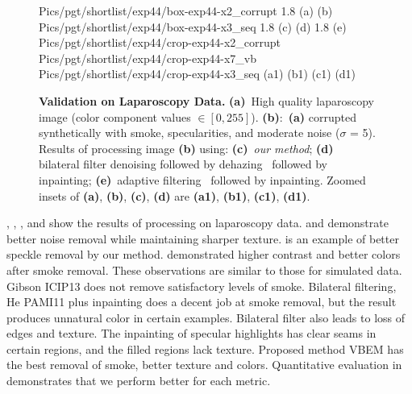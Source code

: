 \begin{figure}[!h]
     {Pics/pgt/shortlist/exp44/box-exp44-x2_corrupt}  {1.8} {(a)} {(b)}
     {Pics/pgt/shortlist/exp44/box-exp44-x3_seq} {1.8} {(c)} {(d)}
     {1.8} {(e)}
     {Pics/pgt/shortlist/exp44/crop-exp44-x2_corrupt} {Pics/pgt/shortlist/exp44/crop-exp44-x7_vb} {Pics/pgt/shortlist/exp44/crop-exp44-x3_seq}  {(a1)} {(b1)} {(c1)} {(d1)}
    \caption
    {
        {\bf Validation on Laparoscopy Data. }
        {\bf (a)}~High quality laparoscopy image (color component values $\in [0,255]$).
        {\bf (b)}:~{\bf (a)} corrupted synthetically with smoke, specularities, and moderate noise ($\sigma$ = 5).
        Results of processing image {\bf (b)} using:
        {\bf (c)}~{\em our method};
        {\bf (d)}~ bilateral filter denoising followed by dehazing~\cite{he2011dark} followed by inpainting;
        {\bf (e)}~adaptive filtering~\cite{gibson2013wiener} followed by inpainting.
        Zoomed insets of {\bf (a)}, {\bf (b)}, {\bf (c)}, {\bf (d)} are {\bf (a1)}, {\bf (b1)}, {\bf (c1)}, {\bf (d1)}.
    }
    \label{fig:imagesPgt4}
\end{figure}


, , , and  show the results of processing on laparoscopy data.  and  demonstrate better noise removal while maintaining sharper texture. is an example of better speckle removal by our method.  demonstrated higher contrast and better colors after smoke removal. These observations are similar to those for simulated data. Gibson ICIP13 \cite{gibson2013wiener} does not remove satisfactory levels of smoke. Bilateral filtering, He PAMI11 \cite{he2011dark} plus inpainting does a decent job at smoke removal, but the result produces unnatural color in certain examples. Bilateral filter also leads to loss of edges and texture. The inpainting of specular highlights has clear seams in certain regions, and the filled regions lack texture. Proposed method VBEM has the best removal of smoke, better texture and colors. Quantitative evaluation in  demonstrates that we perform better for each metric.

